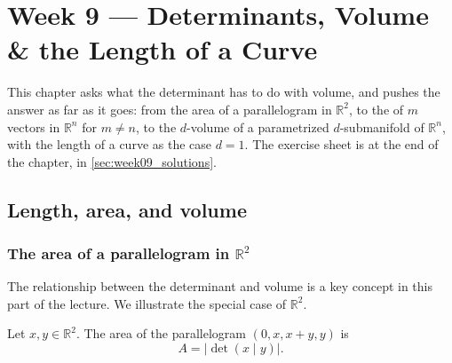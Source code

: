 \chapter{Week 9 --- Determinants, Volume \& the Length of a Curve}
\label{ch:week09}

This chapter asks what the determinant has to do with volume, and pushes the answer as far
as it goes: from the area of a parallelogram in $\mathbb{R}^2$, to the  of $m$ vectors in $\mathbb{R}^n$ for $m \neq n$, to the $d$-volume of a
parametrized $d$-submanifold of $\mathbb{R}^n$, with the length of a curve as the case
$d=1$. The exercise sheet is at the end of the chapter, in \cref{sec:week09_solutions}.

\section{Length, area, and volume}
\label{sec:length_area_volume}

\subsection{The area of a parallelogram in \texorpdfstring{$\mathbb{R}^2$}{R2}}
\label{sec:area_parallelogram}

The relationship between the determinant and volume is a key concept in this part of the
lecture. We illustrate the special case of $\mathbb{R}^2$.

\begin{proposition}
\label{prop:area_parallelogram_r2}
Let $x,y \in \mathbb{R}^2$. The area of the parallelogram $(0,x,x+y,y)$ is
\[A = \big|\det(x\mid y)\big|.\]
\end{proposition}

